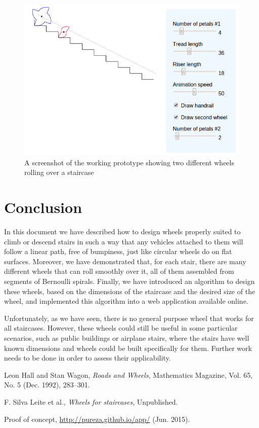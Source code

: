 \documentclass{article}
\theoremstyle{theorem}
\theoremstyle{theorem}
\begin{document}
\begin{figure}[h]
  \centering
  \includegraphics[width=.9\linewidth]{fig-prototype.png}
  \caption{A screenshot of the working prototype showing two different
    wheels rolling over a staircase}
  \label{fig:prototype}
\end{figure}


\section{Conclusion}

In this document we have described how to design wheels properly
suited to climb or descend stairs in such a way that any vehicles
attached to them will follow a linear path, free of bumpiness, just
like circular wheels do on flat surfaces. Moreover, we have
demonstrated that, for each stair, there are many different wheels
that can roll smoothly over it, all of them assembled from segments of
Bernoulli spirals. Finally, we have introduced an algorithm to design
these wheels, based on the dimensions of the staircase and the desired
size of the wheel, and implemented this algorithm into a web
application available online.

Unfortunately, as we have seen, there is no general purpose wheel that
works for all staircases. However, these wheels could still be useful
in some particular scenarios, such as public buildings or airplane
stairs, where the stairs have well known dimensions and wheels could
be built specifically for them. Further work needs to be done in order
to assess their applicability.

\begin{thebibliography}{10}

Leon Hall and Stan Wagon, {\it Roads and Wheels},
  Mathematics Magazine, Vol. 65, No. 5 (Dec. 1992), 283--301.

F. Silva Leite et al., {\it Wheels for staircases},
  Unpublished.

Proof of concept,
  \url{http://pureza.github.io/app/} (Jun. 2015).

\end{thebibliography}
\end{document}
